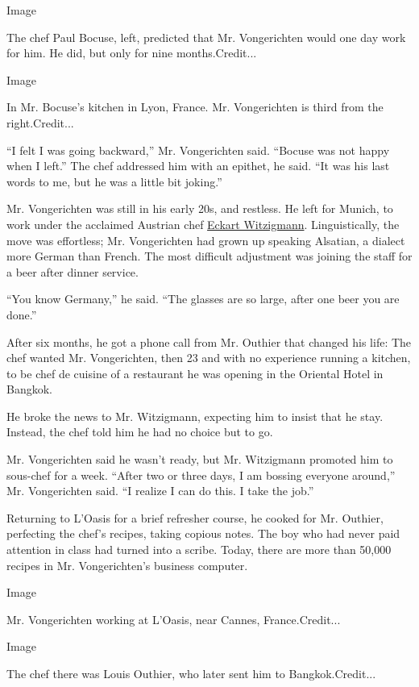 Image

The chef Paul Bocuse, left, predicted that Mr. Vongerichten would one
day work for him. He did, but only for nine months.Credit...

Image

In Mr. Bocuse's kitchen in Lyon, France. Mr. Vongerichten is third from
the right.Credit...

``I felt I was going backward,'' Mr. Vongerichten said. ``Bocuse was not
happy when I left.'' The chef addressed him with an epithet, he said.
``It was his last words to me, but he was a little bit joking.''

Mr. Vongerichten was still in his early 20s, and restless. He left for
Munich, to work under the acclaimed Austrian chef
\href{https://www.myriadrestaurantgroup.com/news-item/batard-honors-chef-eckart-witzigmann/}{Eckart
Witzigmann}. Linguistically, the move was effortless; Mr. Vongerichten
had grown up speaking Alsatian, a dialect more German than French. The
most difficult adjustment was joining the staff for a beer after dinner
service.

``You know Germany,'' he said. ``The glasses are so large, after one
beer you are done.''

After six months, he got a phone call from Mr. Outhier that changed his
life: The chef wanted Mr. Vongerichten, then 23 and with no experience
running a kitchen, to be chef de cuisine of a restaurant he was opening
in the Oriental Hotel in Bangkok.

He broke the news to Mr. Witzigmann, expecting him to insist that he
stay. Instead, the chef told him he had no choice but to go.

Mr. Vongerichten said he wasn't ready, but Mr. Witzigmann promoted him
to sous-chef for a week. ``After two or three days, I am bossing
everyone around,'' Mr. Vongerichten said. ``I realize I can do this. I
take the job.''

Returning to L'Oasis for a brief refresher course, he cooked for Mr.
Outhier, perfecting the chef's recipes, taking copious notes. The boy
who had never paid attention in class had turned into a scribe. Today,
there are more than 50,000 recipes in Mr. Vongerichten's business
computer.

Image

Mr. Vongerichten working at L'Oasis, near Cannes, France.Credit...

Image

The chef there was Louis Outhier, who later sent him to
Bangkok.Credit...


